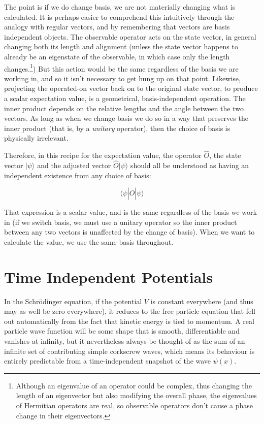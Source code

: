 The point is if we do change basis, we are not materially changing what is calculated. It is perhaps easier to comprehend this intuitively through the analogy with regular vectors, and by remembering that vectors are basis independent objects. The observable operator acts on the state vector, in general changing both its length and alignment (unless the state vector happens to already be an eigenstate of the observable, in which case only the length changes.\footnote{Although an eigenvalue of an operator could be complex, thus changing the length of an eigenvector but also modifying the overall phase, the eigenvalues of Hermitian operators are real, so observable operators don't cause a phase change in their eigenvectors.}) But this action would be the same regardless of the basis we are working in, and so it isn't necessary to get hung up on that point. Likewise, projecting the operated-on vector back on to the original state vector, to produce a scalar expectation value, is a geometrical, basis-independent operation. The inner product depends on the relative lengths and the angle between the two vectors. As long as when we change basis we do so in a way that preserves the inner product (that is, by a \textit{unitary} operator), then the choice of basis is physically irrelevant. 

Therefore, in this recipe for the expectation value, the operator $\hat{O}$, the state vector $| \psi \rangle$ and the adjusted vector $\hat{O} | \psi \rangle$ should all be understood as having an independent existence from any choice of basis:

$$
\langle \psi| \hat{O} | \psi \rangle
$$

That expression is a scalar value, and is the same regardless of the basis we work in (if we switch basis, we must use a unitary operator so the inner product between any two vectors is unaffected by the change of basis). When we want to calculate the value, we use the same basis throughout.

\section{Time Independent Potentials}

In the Schrödinger equation, if the potential $V$ is constant everywhere (and thus may as well be zero everywhere), it reduces to the free particle equation that fell out automatically from the fact that kinetic energy is tied to momentum. A real particle wave function will be some shape that is smooth, differentiable and vanishes at infinity, but it nevertheless always be thought of as the sum of an infinite set of contributing simple corkscrew waves, which means its behaviour is entirely predictable from a time-independent snapshot of the wave $\psi(x)$.

